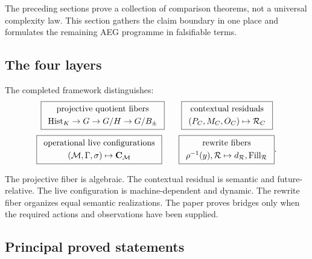 The preceding sections prove a collection of comparison theorems, not a
universal complexity law.  This section gathers the claim boundary in one
place and formulates the remaining AEG programme in falsifiable terms.

\subsection{The four layers}

The completed framework distinguishes:
\begin{equation}
\boxed{
\begin{array}{c}
\text{projective quotient fibers}\\[1mm]
\operatorname{Hist}_K\to G\to G/H\to G/B_\pm
\end{array}}
\qquad
\boxed{
\begin{array}{c}
\text{contextual residuals}\\[1mm]
(P_C,M_C,O_C)\mapsto\mathcal R_C
\end{array}}
\label{eq:four-layer-first-pair}
\end{equation}
\begin{equation}
\boxed{
\begin{array}{c}
\text{operational live configurations}\\[1mm]
(\mathcal M,\Gamma,\sigma)\mapsto\mathbf C_\mathcal M
\end{array}}
\qquad
\boxed{
\begin{array}{c}
\text{rewrite fibers}\\[1mm]
\rho^{-1}(y),\mathcal R\mapsto d_\mathcal R,\operatorname{Fill}_\mathcal R
\end{array}}.
\label{eq:four-layer-second-pair}
\end{equation}

The projective fiber is algebraic.  The contextual residual is semantic and
future-relative.  The live configuration is machine-dependent and dynamic.
The rewrite fiber organizes equal semantic realizations.  The paper proves
bridges only when the required actions and observations have been supplied.

\subsection{Principal proved statements}

